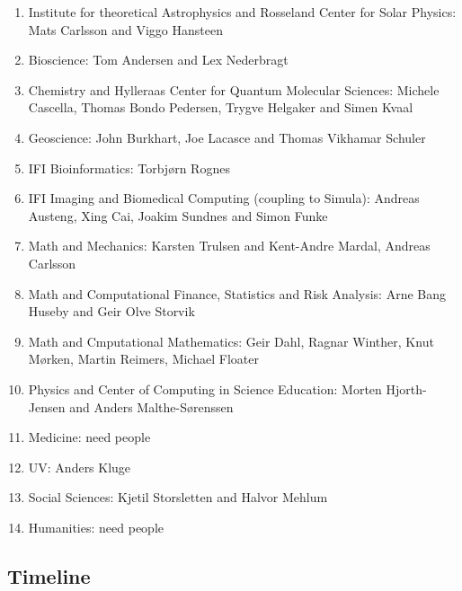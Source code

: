 \documentclass[%
oneside,                 %
final,                   %
10pt]{article}
\begin{document}
\begin{enumerate}
\item Institute for theoretical Astrophysics and Rosseland Center for Solar Physics: Mats Carlsson and Viggo Hansteen

\item Bioscience: Tom Andersen and Lex Nederbragt

\item Chemistry and Hylleraas Center for Quantum Molecular Sciences: Michele Cascella, Thomas Bondo Pedersen, Trygve Helgaker and Simen Kvaal

\item Geoscience: John Burkhart, Joe Lacasce and Thomas Vikhamar Schuler

\item IFI Bioinformatics: Torbjørn Rognes

\item IFI Imaging and Biomedical Computing (coupling to Simula): Andreas Austeng, Xing Cai, Joakim Sundnes and Simon Funke

\item Math and Mechanics: Karsten Trulsen and Kent-Andre Mardal, Andreas Carlsson

\item Math and Computational Finance, Statistics and Risk Analysis: Arne Bang Huseby and Geir Olve Storvik

\item Math and Cmputational Mathematics: Geir Dahl, Ragnar Winther, Knut Mørken, Martin Reimers, Michael Floater

\item Physics and Center of Computing in Science Education: Morten Hjorth-Jensen and  Anders Malthe-Sørenssen

\item Medicine: need people

\item UV: Anders Kluge

\item Social Sciences: Kjetil Storsletten and Halvor Mehlum

\item Humanities: need people
\end{enumerate}

\noindent
\subsection{Timeline}
\end{document}
